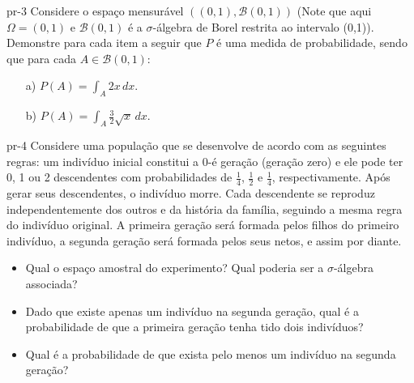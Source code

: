 \begin{problema}{}{pr-3}
Considere o espaço mensurável $((0, 1), \mathcal{B}(0, 1))$ (Note que aqui $\Omega=(0,1)$ e $\mathcal{B}(0, 1)$ é a $\sigma$-álgebra de Borel restrita ao intervalo (0,1)).
Demonstre para cada item a seguir que $P$ é uma medida de probabilidade, sendo que para cada $A \in \mathcal{B}(0, 1)$:

\begin{enumerate}
	\item[a)] $\displaystyle P(A) = \int_A 2x \, dx$.
	
	\item[b)] $\displaystyle P(A) = \int_A \frac{3}{2} \sqrt{x} \, dx$.
\end{enumerate}
\end{problema}


\begin{problema}{}{pr-4}
Considere uma população que se desenvolve de acordo com as seguintes regras:
um indivíduo inicial constitui a 0-é geração (geração zero) e ele pode ter 0, 1 ou 2 descendentes com probabilidades de $\frac{1}{4}$, $\frac{1}{2}$ e $\frac{1}{4}$, respectivamente. Após gerar seus descendentes, o indivíduo morre. Cada descendente se reproduz independentemente dos outros e da história da família, seguindo a mesma regra do indivíduo original. A primeira geração será formada pelos filhos do primeiro indivíduo, a segunda geração será formada pelos seus netos, e assim por diante.
\begin{itemize}
	\item Qual o espaço amostral do experimento? Qual poderia  ser a $\sigma$-álgebra associada?
	\item Dado que existe apenas um indivíduo na segunda geração, qual é a probabilidade de que a primeira geração tenha tido dois indivíduos?
	\item Qual é a probabilidade de que exista pelo menos um indivíduo na segunda geração?
\end{itemize}
\end{problema}




